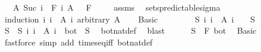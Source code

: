 \begin{isabellebody}
\ \ \ {\isachardoublequoteopen}A\ {\isacharparenleft}{\kern0pt}Suc\ i{\isacharparenright}{\kern0pt}\ {\isasymin}\ F\ i{\isachardoublequoteclose}\ {\isachardoublequoteopen}A\ {}\ {\isasymin}\ F\ {}{\isachardoublequoteclose}\isanewline
%
\isadelimproof
\ \ %
\endisadelimproof
%
\isatagproof
{}\isamarkupfalse%
\ assms\ \isamarkupfalse%
\ sets{\isacharunderscore}{\kern0pt}predictable{\isacharunderscore}{\kern0pt}sigma\isanewline
{}\isamarkupfalse%
\ {\isacharparenleft}{\kern0pt}induction\ {\isachardoublequoteopen}{\isacharparenleft}{\kern0pt}{\isasymUnion}i{\isachardot}{\kern0pt}\ {\isacharbraceleft}{\kern0pt}i{\isacharbraceright}{\kern0pt}\ {\isasymtimes}\ A\ i{\isacharparenright}{\kern0pt}{\isachardoublequoteclose}\ arbitrary{\isacharcolon}{\kern0pt}\ A{\isacharparenright}{\kern0pt}\isanewline
\ \ \isamarkupfalse%
\ Basic\isanewline
\ \ \isacommand{{\isacharbraceleft}{\kern0pt}}\isamarkupfalse%
\isanewline
\ \ \ \ \isamarkupfalse%
\ {\isachardoublequoteopen}{\isasymexists}S{\isachardot}{\kern0pt}\ {\isacharparenleft}{\kern0pt}{\isasymUnion}i{\isachardot}{\kern0pt}\ {\isacharbraceleft}{\kern0pt}i{\isacharbraceright}{\kern0pt}\ {\isasymtimes}\ A\ i{\isacharparenright}{\kern0pt}\ {\isacharequal}{\kern0pt}\ {\isacharbraceleft}{\kern0pt}{}{\isacharbraceright}{\kern0pt}\ {\isasymtimes}\ S{\isachardoublequoteclose}\isanewline
\ \ \ \ \isamarkupfalse%
\ \isamarkupfalse%
\ S\ \ S{\isacharcolon}{\kern0pt}\ {\isachardoublequoteopen}{\isacharparenleft}{\kern0pt}{\isasymUnion}i{\isachardot}{\kern0pt}\ {\isacharbraceleft}{\kern0pt}i{\isacharbraceright}{\kern0pt}\ {\isasymtimes}\ A\ i{\isacharparenright}{\kern0pt}\ {\isacharequal}{\kern0pt}\ {\isacharbraceleft}{\kern0pt}bot{\isacharbraceright}{\kern0pt}\ {\isasymtimes}\ S{\isachardoublequoteclose}\ \isamarkupfalse%
\ bot{\isacharunderscore}{\kern0pt}nat{\isacharunderscore}{\kern0pt}def\ \isamarkupfalse%
\ blast\isanewline
\ \ \ \ \isamarkupfalse%
\ {\isachardoublequoteopen}S\ {\isasymin}\ F\ bot{\isachardoublequoteclose}\ \isamarkupfalse%
\ Basic\ \isamarkupfalse%
\ {\isacharparenleft}{\kern0pt}fastforce\ simp\ add{\isacharcolon}{\kern0pt}\ times{\isacharunderscore}{\kern0pt}eq{\isacharunderscore}{\kern0pt}iff\ bot{\isacharunderscore}{\kern0pt}nat{\isacharunderscore}{\kern0pt}def{\isacharparenright}{\kern0pt}\isanewline
\ \ \ \ \isamarkupfalse%

\end{isabellebody}
